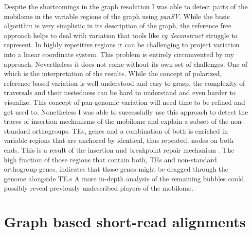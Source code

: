 Despite the shortcomings in the graph resolution I was able to detect parts of the mobilome in the variable regions of the graph using \textit{panSV}. While the basic algorithm is very simplistic in its description of the graph, the reference free approach helps to deal with variation that tools like \textit{vg deconstruct} struggle to represent. In highly repetitive regions it can be challenging to project variation into a linear coordinate system. This problem is entirely circumvented by my approach. Nevertheless it does not come without its own set of challenges. One of which is the interpretation of the results. While the concept of polarized, reference based variation is well understood and easy to grasp, the complexity of traversals and their nestedness can be hard to understand and even harder to visualize. This concept of pan-genomic variation will need time to be refined and get used to. Nonetheless I was able to successfully use this approach to detect the traces of insertion mechanisms of the mobilome and explain a subset of the non-standard orthogroups. TEs, genes and a combination of both is enriched in variable regions that are anchored by identical, thus repeated, nodes on both ends. This is a result of the insertion and breakpoint repair mechanism \citep{Chatterjee2017-dk}. The high fraction of those regions that contain both, TEs and non-standard orthogroup genes, indicates that those genes might be dragged through the genome alongside TE.s A more in-depth analysis of the remaining bubbles could possibly reveal previously undescribed players of the mobilome. 

\section{Graph based short-read alignments}
\label{sec:graphBasedShortReadAlignments}

